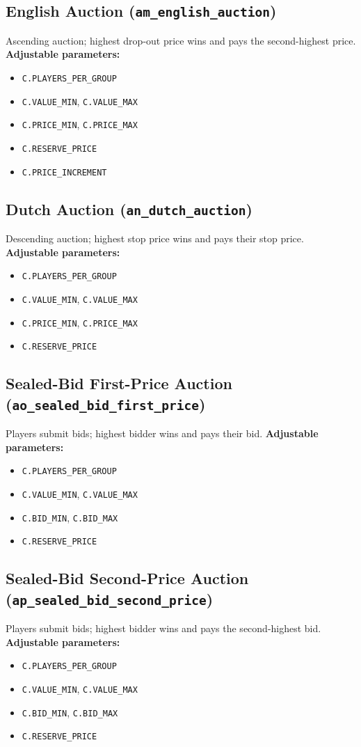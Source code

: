 \documentclass[11pt]{article}
\begin{document}
\subsection*{English Auction (\texttt{am\_english\_auction})}
Ascending auction; highest drop-out price wins and pays the second-highest price.
\textbf{Adjustable parameters:}
\begin{itemize}
\item \texttt{C.PLAYERS\_PER\_GROUP}
\item \texttt{C.VALUE\_MIN}, \texttt{C.VALUE\_MAX}
\item \texttt{C.PRICE\_MIN}, \texttt{C.PRICE\_MAX}
\item \texttt{C.RESERVE\_PRICE}
\item \texttt{C.PRICE\_INCREMENT}
\end{itemize}

\subsection*{Dutch Auction (\texttt{an\_dutch\_auction})}
Descending auction; highest stop price wins and pays their stop price.
\textbf{Adjustable parameters:}
\begin{itemize}
\item \texttt{C.PLAYERS\_PER\_GROUP}
\item \texttt{C.VALUE\_MIN}, \texttt{C.VALUE\_MAX}
\item \texttt{C.PRICE\_MIN}, \texttt{C.PRICE\_MAX}
\item \texttt{C.RESERVE\_PRICE}
\end{itemize}

\subsection*{Sealed-Bid First-Price Auction (\texttt{ao\_sealed\_bid\_first\_price})}
Players submit bids; highest bidder wins and pays their bid.
\textbf{Adjustable parameters:}
\begin{itemize}
\item \texttt{C.PLAYERS\_PER\_GROUP}
\item \texttt{C.VALUE\_MIN}, \texttt{C.VALUE\_MAX}
\item \texttt{C.BID\_MIN}, \texttt{C.BID\_MAX}
\item \texttt{C.RESERVE\_PRICE}
\end{itemize}

\subsection*{Sealed-Bid Second-Price Auction (\texttt{ap\_sealed\_bid\_second\_price})}
Players submit bids; highest bidder wins and pays the second-highest bid.
\textbf{Adjustable parameters:}
\begin{itemize}
\item \texttt{C.PLAYERS\_PER\_GROUP}
\item \texttt{C.VALUE\_MIN}, \texttt{C.VALUE\_MAX}
\item \texttt{C.BID\_MIN}, \texttt{C.BID\_MAX}
\item \texttt{C.RESERVE\_PRICE}
\end{itemize}
\end{document}

